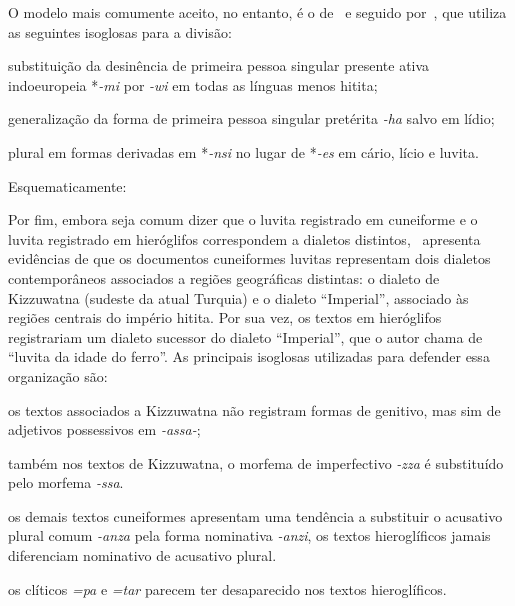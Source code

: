 \vspace{3pt}
\begin{center}
\end{center}

O modelo mais comumente aceito, no entanto, é o de~\citet[92]{Oettinger1978} e
seguido por~\citet[6]{Yakubovich2010}, que utiliza as seguintes isoglosas para a
divisão:
\begin{inparaenum}
	\item substituição da desinência de primeira pessoa singular presente ativa
	indoeuropeia *\emph{-mi} por \emph{-wi} em todas as línguas menos hitita;
	\item generalização da forma de primeira pessoa singular pretérita \emph{-ha}
	salvo em lídio;
	\item plural em formas derivadas em *\emph{-nsi} no lugar de *\emph{-es} em
	cário, lício e luvita.
\end{inparaenum}
Esquematicamente:

\begin{center}
\end{center}

Por fim, embora seja comum dizer que o luvita registrado em cuneiforme e o
luvita registrado em hieróglifos correspondem a dialetos
distintos,~\citet{Yakubovich2010} apresenta evidências de que os
documentos cuneiformes luvitas representam dois dialetos contemporâneos
associados a regiões geográficas distintas: o dialeto de Kizzuwatna (sudeste da
atual Turquia) e o dialeto ``Imperial'', associado às regiões centrais do
império hitita.
Por sua vez, os textos em hieróglifos registrariam um dialeto sucessor do
dialeto ``Imperial'', que o autor chama de ``luvita da idade do ferro''.
As principais isoglosas utilizadas para defender essa organização são:
\begin{inparaenum}
	\item os textos associados a Kizzuwatna não registram formas de genitivo, mas
	sim de adjetivos possessivos em \emph{-assa-};
	\item também nos textos de Kizzuwatna, o morfema de imperfectivo \emph{-zza}
	é substituído pelo morfema \emph{-ssa}.
	\item os demais textos cuneiformes apresentam uma tendência a substituir o
	acusativo plural comum \emph{-anza} pela forma nominativa \emph{-anzi},
	os textos hieroglíficos jamais diferenciam nominativo de acusativo plural.
	\item os clíticos \emph{=pa} e \emph{=tar} parecem ter desaparecido nos textos
	hieroglíficos.
\end{inparaenum}


